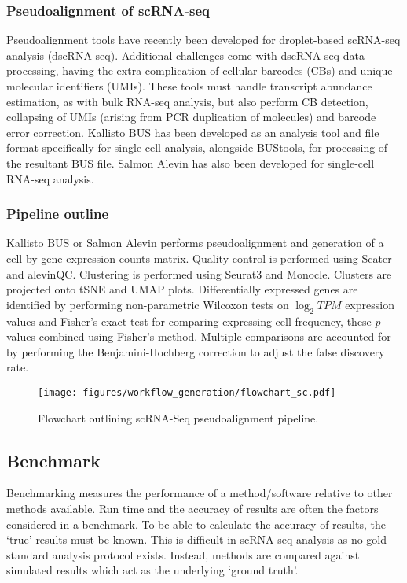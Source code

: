 \subsubsection{Pseudoalignment of scRNA-seq}
Pseudoalignment tools have recently been developed for droplet-based scRNA-seq analysis (dscRNA-seq).
Additional challenges come with dscRNA-seq data processing, having the extra complication of cellular barcodes (CBs) and unique molecular identifiers (UMIs).
These tools must handle transcript abundance estimation, as with bulk RNA-seq analysis, but also perform CB detection, collapsing of UMIs (arising from PCR duplication of molecules) and barcode error correction.
Kallisto BUS\cite{melsted2018barcode} has been developed as an analysis tool and file format specifically for single-cell analysis, alongside BUStools, for processing of the resultant BUS file\cite{melsted2019modular}.
Salmon Alevin\cite{srivastava2019alevin} has also been developed for single-cell RNA-seq analysis.

\subsubsection{Pipeline outline}
Kallisto BUS or Salmon Alevin performs pseudoalignment and generation of a cell-by-gene expression counts matrix.
Quality control is performed using Scater\cite{mccarthy2017scater} and alevinQC.
Clustering is performed using Seurat3\cite{stuart2019comprehensive} and Monocle\cite{trapnell2014dynamics}.
Clusters are projected onto tSNE and UMAP plots.
Differentially expressed genes are identified by performing non-parametric Wilcoxon tests on $\log_2 TPM$ expression values and Fisher's exact test for comparing expressing cell frequency, these $p$ values combined using Fisher's method.
Multiple comparisons are accounted for by performing the Benjamini-Hochberg correction to adjust the false discovery rate.

\begin{figure}[htbp]
\centering
\texttt{[image: figures/workflow\_generation/flowchart\_sc.pdf]}
\caption[scRNA-Seq pseudoalignment pipeline outline]{Flowchart outlining scRNA-Seq pseudoalignment pipeline.}
\label{fig:flowchart_scRNA}
\end{figure}

\subsection{Benchmark}\label{subsec:sc_bench}
Benchmarking measures the performance of a method/software relative to other methods available.
Run time and the accuracy of results are often the factors considered in a benchmark.
To be able to calculate the accuracy of results, the `true' results must be known.
This is difficult in scRNA-seq analysis as no gold standard analysis protocol exists.
Instead, methods are compared against simulated results which act as the underlying `ground truth'.

